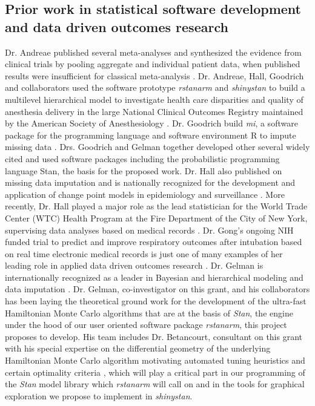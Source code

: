 \documentclass[11pt,notitlepage]{article}
\begin{document}
\subsection*{Prior work in statistical software development and data driven outcomes research} Dr. Andreae published several meta-analyses and synthesized the evidence 
from clinical trials by pooling aggregate and individual patient data, when 
published results were insufficient for classical meta-analysis 
\cite{AndreaeJohnsonAbstract2013, Andreae2013, Andreae2015, Carter2015, Atchabahian2015}. Dr. Andreae, Hall, Goodrich and collaborators used the software 
prototype \textit{rstanarm} and \textit{shinystan} to build a multilevel 
hierarchical model to investigate health care disparities and quality of 
anesthesia delivery in the large National Clinical Outcomes Registry maintained 
by the American Society of Anesthesiology \cite{AndreaeWhite2015}. Dr. Goodrich 
build \textit{mi}, a software package for the programming language and 
software environment R to impute missing data \cite{miCRAN}. Drs. Goodrich 
and Gelman together developed other several widely cited and used software packages including the probabilistic programming language Stan\cite{Stan_Software_2014}, 
the basis for the proposed work. Dr. Hall also published on missing data 
imputation \cite{Hall2009a, Wang_20029935, Wang_20029935} and is nationally 
recognized for the development and application of change point models in 
epidemiology and surveillance 
\cite{Hall2000, Hall2001, Hall2003bayesian, Hall2009, Hall2015}. 
More recently, Dr. Hall played a major role as the lead statistician 
for the World Trade Center (WTC) Health Program at the Fire Department 
of the City of New York, supervising data analyses based on medical 
records \cite{Aldrich2010, Hall2015, Zeig-Owens2011}.  
Dr. Gong's ongoing NIH funded trial to predict and improve 
respiratory outcomes after intubation based on real time 
electronic medical records is just one of many examples of her 
leading role in applied data driven outcomes research 
\cite{Gong2005, Gong2010, Gajic2011, Yu_24970344, Kor2014}. 
Dr. Gelman is internationally recognized as a leader in Bayesian and hierarchical 
modeling and data imputation 
\cite{Gelman1998notasked, Gelman2001imputation, Hoffman2014, Gelman-Hill_2014}. 
Dr. Gelman, co-investigator on this grant, and his collaborators has been laying the 
theoretical ground work for the development of the ultra-fast Hamiltonian 
Monte Carlo algorithms \cite{Hoffman2014,Stan_Software_2014} 
that are at the basis of \textit{Stan}, the engine 
under the hood of our user oriented software package \textit{rstanarm}, 
this project proposes to develop. His team includes Dr. Betancourt, 
consultant on this grant with his special expertise on the differential 
geometry of the underlying Hamiltonian Monte Carlo algorithm
motivating automated tuning heuristics and certain optimality criteria 
\cite{BetancourtGeometry2016}, which will play a 
critical part in our programming of the \textit{Stan} model library 
which \textit{rstanarm} will call on and in the tools for graphical exploration
we propose to implement in \textit{shinystan}.
\end{document}
